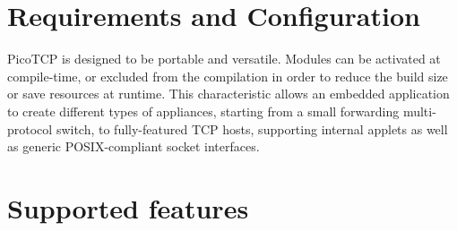 \section{Requirements and Configuration}

PicoTCP is designed to be portable and versatile. Modules can be activated at
compile-time, or excluded from the compilation in order to reduce the build size
or save resources at runtime. This characteristic allows an embedded
application to create different types of appliances, starting from a small
forwarding multi-protocol switch, to fully-featured TCP hosts, supporting
internal applets as well as generic POSIX-compliant socket interfaces.


\section{Supported features}
